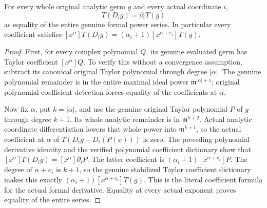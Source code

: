 \begin{theorem}
\label{hir:actual-whole-original-taylor-coordinate-derivative}
\leanok
For every whole original analytic germ $g$ and every actual coordinate $i$,
\[
 T(D_i g)=\partial_iT(g)
\]
as equality of the entire genuine formal power series. In particular every
coefficient satisfies
$[x^\alpha]T(D_i g)=(\alpha_i+1)[x^{\alpha+e_i}]T(g)$.
\end{theorem}
\begin{proof}
First, for every complex polynomial $Q$, its genuine evaluated germ has
Taylor coefficient $[x^\alpha]Q$. To verify this without a convergence
assumption, subtract its canonical original Taylor polynomial through degree
$|\alpha|$. The genuine polynomial remainder is in the entire maximal
ideal power $\mathfrak m^{|\alpha|+1}$; original polynomial coefficient
detection forces equality of the coefficients at $\alpha$.

Now fix $\alpha$, put $k=|\alpha|$, and use the genuine original Taylor
polynomial $P$ of $g$ through degree $k+1$. Its whole analytic remainder is
in $\mathfrak m^{k+2}$. Actual analytic coordinate differentiation lowers
that whole power into $\mathfrak m^{k+1}$, so the actual coefficient at
$\alpha$ of $T(D_i g-D_i(P(x)))$ is zero. The preceding polynomial
derivative identity and the verified polynomial coefficient dictionary show
that $[x^\alpha]T(D_i g)=[x^\alpha]\partial_iP$.
The latter coefficient is
$(\alpha_i+1)[x^{\alpha+e_i}]P$.
The degree of $\alpha+e_i$ is $k+1$, so the genuine stabilized Taylor
coefficient dictionary makes this exactly
$(\alpha_i+1)[x^{\alpha+e_i}]T(g)$.
This is the literal coefficient formula for the actual formal derivative.
Equality at every actual exponent proves equality of the entire series.
\end{proof}
